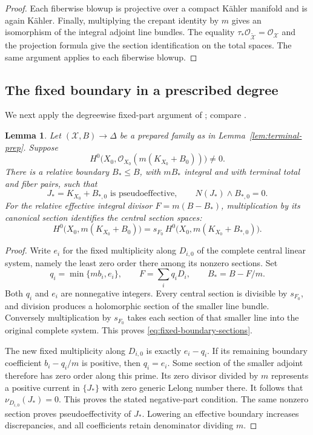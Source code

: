 \documentclass[11pt,a4paper]{article}
\numberwithin{equation}{section}
\newtheorem{lemma}[theorem]{Lemma}
\theoremstyle{definition}
\theoremstyle{remark}
\newcommand{\OO}{\mathcal O}\newcommand{\cX}{\mathcal X}
\begin{document}
\begin{proof}
Each fiberwise blowup is projective over a compact Kähler manifold
and is again Kähler. Finally, multiplying the crepant identity by $m$ gives an
isomorphism of the integral adjoint line bundles. The equality
$\tau_*\OO_{\widetilde{\cX}}=\OO_{\cX}$ and the projection formula
give the section identification on the total spaces. The same
argument applies to each fiberwise blowup.
\end{proof}

\subsection{The fixed boundary in a prescribed degree}

We next apply the degreewise fixed-part argument of
\cite[proof of Theorem~4.2]{HMX2018}; compare
\cite[Section~4.3]{LW2026}.

\begin{lemma}\label{lem:fixed-boundary}
Let $(\cX,B)\to\Delta$ be a prepared family as in
Lemma~\ref{lem:terminal-prep}. Suppose
\[
 H^0\bigl(X_0,\OO_{X_0}(m(K_{X_0}+B_0))\bigr)\ne0.
\]
There is a relative boundary $B_*\le B$, with $mB_*$ integral and
with terminal total and fiber pairs, such that
\[
 J_*=K_{X_0}+B_{*,0}\text{ is pseudoeffective},
 \qquad N(J_*)\wedge B_{*,0}=0.
\]
For the relative effective integral divisor $F=m(B-B_*)$,
multiplication by its canonical section identifies the central
section spaces:
\begin{equation}\label{eq:fixed-boundary-sections}
 H^0\bigl(X_0,m(K_{X_0}+B_0)\bigr)
 =s_{F_0}\,H^0\bigl(X_0,m(K_{X_0}+B_{*,0})\bigr).
\end{equation}
\end{lemma}

\begin{proof}
Write $e_i$ for the fixed multiplicity along $D_{i,0}$ of the
complete central linear system, namely the least zero order there
among its nonzero sections. Set
\[
 q_i=\min\{mb_i,e_i\},\qquad
 F=\sum_iq_iD_i,\qquad B_*=B-F/m.
\]
Both $q_i$ and $e_i$ are nonnegative integers. Every central section
is divisible by $s_{F_0}$, and division produces a holomorphic section
of the smaller line bundle. Conversely multiplication by $s_{F_0}$
takes each section of that smaller line into the original complete
system. This proves \eqref{eq:fixed-boundary-sections}.

The new fixed multiplicity along $D_{i,0}$ is exactly $e_i-q_i$.
If its remaining boundary coefficient $b_i-q_i/m$ is positive, then
$q_i=e_i$. Some section of the smaller adjoint therefore has zero order
along this prime. Its zero divisor divided by $m$ represents a
positive current in $\{J_*\}$ with zero generic Lelong number there.
It follows that $\nu_{D_{i,0}}(J_*)=0$. This proves the stated
negative-part condition. The same nonzero section proves
pseudoeffectivity of $J_*$. Lowering an effective boundary increases
discrepancies, and all coefficients retain denominator dividing $m$.
\end{proof}
\end{document}
